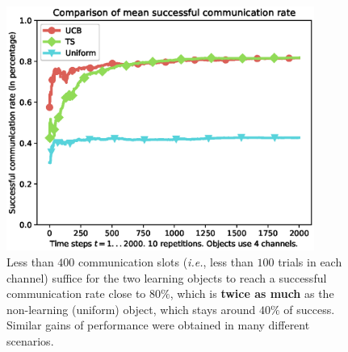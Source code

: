 \begin{figure}[!t]
	\centering
    \includegraphics[height=8.0cm]{2-Chapters/4-Chapter/IEEE_WCNC_2019__DemoICT.git/pictures/plot_datafile_append_Uniform_vs_UCB_vs_TS.eps}
    \caption{Less than $400$ communication slots (\emph{i.e.}, less than $100$ trials in each channel) suffice for the two learning objects to reach a successful communication rate close to $80\%$, which is \textbf{twice as much} as the non-learning (uniform) object, which stays around $40\%$ of success. Similar gains of performance were obtained in many different scenarios.}
    \label{fig:42:plot_datafile_append_Uniform_vs_UCB_vs_TS}
\end{figure}




